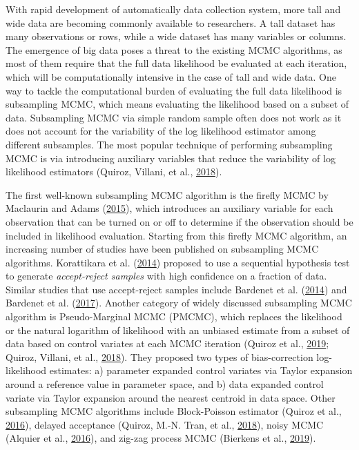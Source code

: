 \documentclass[12pt]{book}
\numberwithin{equation}{chapter}
\begin{document}
With rapid development of automatically data collection system, more tall and wide data are becoming commonly available to researchers. A tall dataset has many observations or rows, while a wide dataset has many variables or columns. The emergence of big data poses a threat to the existing MCMC algorithms, as most of them require that the full data likelihood be evaluated at each iteration, which will be computationally intensive in the case of tall and wide data. One way to tackle the computational burden of evaluating the full data likelihood is subsampling MCMC, which means evaluating the likelihood based on a subset of data. Subsampling MCMC via simple random sample often does not work as it does not account for the variability of the log likelihood estimator among different subsamples. The most popular technique of performing subsampling MCMC is via introducing auxiliary variables that reduce the variability of log likelihood estimators (Quiroz, Villani, et al., \protect\hyperlink{ref-quiroz2018subsampling}{2018}).

The first well-known subsampling MCMC algorithm is the firefly MCMC by Maclaurin and Adams (\protect\hyperlink{ref-maclaurin2015firefly}{2015}), which introduces an auxiliary variable for each observation that can be turned on or off to determine if the observation should be included in likelihood evaluation. Starting from this firefly MCMC algorithm, an increasing number of studies have been published on subsampling MCMC algorithms. Korattikara et al. (\protect\hyperlink{ref-korattikara2014austerity}{2014}) proposed to use a sequential hypothesis test to generate \emph{accept-reject samples} with high confidence on a fraction of data. Similar studies that use accept-reject samples include Bardenet et al. (\protect\hyperlink{ref-bardenet2014towards}{2014}) and Bardenet et al. (\protect\hyperlink{ref-bardenet2017markov}{2017}). Another category of widely discussed subsampling MCMC algorithm is Pseudo-Marginal MCMC (PMCMC), which replaces the likelihood or the natural logarithm of likelihood with an unbiased estimate from a subset of data based on control variates at each MCMC iteration (Quiroz et al., \protect\hyperlink{ref-quiroz2019speeding}{2019}; Quiroz, Villani, et al., \protect\hyperlink{ref-quiroz2018subsampling}{2018}). They proposed two types of bias-correction log-likelihood estimates: a) parameter expanded control variates via Taylor expansion around a reference value in parameter space, and b) data expanded control variate via Taylor expansion around the nearest centroid in data space. Other subsampling MCMC algorithms include Block-Poisson estimator (Quiroz et al., \protect\hyperlink{ref-quiroz2016block}{2016}), delayed acceptance (Quiroz, M.-N. Tran, et al., \protect\hyperlink{ref-quiroz2018speeding}{2018}), noisy MCMC (Alquier et al., \protect\hyperlink{ref-alquier2016noisy}{2016}), and zig-zag process MCMC (Bierkens et al., \protect\hyperlink{ref-bierkens2019zig}{2019}).
\end{document}
